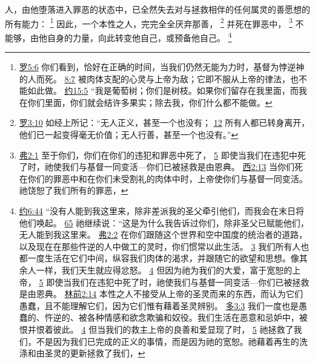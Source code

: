 \documentclass[12pt, a4paper, oneside]{ctexart}
\newcounter{parnum}[section]
\newcommand{\N}{%
   \noindent\refstepcounter{parnum}%
    \makebox[\parindent][l]{\textbf{\arabic{parnum}.}}}
\begin{document}
\N 人，由他堕落进入罪恶的状态中，已全然失去对与拯救相伴的任何属灵的善愿想的所有能力：
	\footnote {
		\href{https://biblehub.com/romans/5-6.htm}{罗5:6} 你们看到，恰好在正确的时间，当我们仍然无能为力时，基督为悖逆神的人而死。
		\href{https://biblehub.com/romans/8-7.htm}{8:7} 被肉体支配的心灵与上帝为敌；它即不服从上帝的律法，也不能如此做。
		\href{https://biblehub.com/john/15-5.htm}{约15:5} “我是葡萄树；你们是树枝。如果你们留存在我里面，而我在你们里面，你们就会结许多果实；除去我，你们什么都不能做。
	}
	因此，一个本性之人，完完全全厌弃那善，
	\footnote {
		\href{https://biblehub.com/romans/3-10.htm}{罗3:10} 如经上所记：“无人正义，甚至一个也没有；
		\href{https://biblehub.com/romans/3-12.htm}{12} 所有人都已转身离开，他们已一起变得毫无价值；无人行善，甚至一个也没有。”
	}
	并死在罪恶中，
	\footnote {
		\href{https://biblehub.com/ephesians/2-1.htm}{弗2:1} 至于你们，你们在你们的违犯和罪恶中死了，
		\href{https://biblehub.com/ephesians/2-5.htm}{5} 即使当我们在违犯中死了时，祂使我们与基督一同变活---你们已被拯救是由恩典。
		\href{https://biblehub.com/colossians/2-13.htm}{西2:13} 当你们死在你们的罪恶中和在你们未受割礼的肉体中时，上帝使你们与基督一同变活。祂饶恕了我们所有的罪恶，
	}
	不能够，由他自身的力量，向此转变他自己，或预备他自己。
	\footnote {
		\href{https://biblehub.com/john/6-44.htm}{约6:44} “没有人能到我这里来，除非差派我的圣父牵引他们，而我会在末日将他们唤起。
		\href{https://biblehub.com/john/6-65.htm}{65} 祂继续说：“这是为什么我告诉过你们，除非圣父已赋能他们，无人能到我这里来。
		\href{https://biblehub.com/ephesians/2-2.htm}{弗2:2} 在你们跟随这个世界和空中国度的统治者的道路，以及现在在那些忤逆的人中做工的灵时，你们惯常以此生活。
		\href{https://biblehub.com/ephesians/2-3.htm}{3} 我们所有人也都一度生活在它们中间，纵容我们肉体的渴求，并跟随它的欲望和思想。像其余人一样，我们天生就应得忿怒。
		\href{https://biblehub.com/ephesians/2-4.htm}{4} 但因为祂为我们的大爱，富于宽恕的上帝，
		\href{https://biblehub.com/ephesians/2-5.htm}{5} 即使当我们在违犯中死了时，祂使我们与基督一同变活---你们已被拯救是由恩典。
		\href{https://biblehub.com/1_corinthians/2-14.htm}{林前2:14} 本性之人不接受从上帝的圣灵而来的东西，而认为它们愚蠢，且不能理解它们，因为它们惟有藉着圣灵辨别。
		\href{https://biblehub.com/titus/3-3.htm}{多3:3} 我们一度也是愚蠢的、忤逆的、被各种情感和欲念欺骗和奴役。我们生活在恶意和忌妒中，被恨并恨着彼此。
		\href{https://biblehub.com/titus/3-4.htm}{4} 但当我们的救主上帝的良善和爱显现了时，
		\href{https://biblehub.com/titus/3-5.htm}{5} 祂拯救了我们，不是因为我们已完成的正义的事情，而是因为祂的宽恕。祂藉着再生的洗涤和由圣灵的更新拯救了我们，
	}
\end{document}
